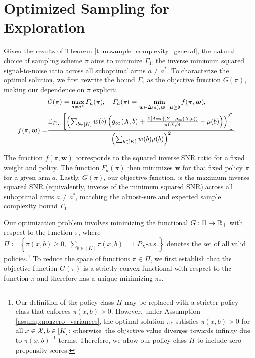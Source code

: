 \documentclass{article}
\begin{document}
\section{Optimized Sampling for Exploration}
\label{sec:sampling}

Given the results of Theorem \ref{thm:sample_complexity_general}, the natural choice of sampling scheme $\pi$ aims to minimize $\Gamma_1$, the inverse minimum squared signal-to-noise ratio across all suboptimal arms $a \neq a^*$. To characterize the optimal solution, we first rewrite the bound $\Gamma_1$ as the objective function $G(\pi)$, making our dependence on $\pi$ explicit:
\begin{align}\label{eq:G_pi}
    &G(\pi) = \max_{a \neq a^*} F_a(\pi), \quad F_a(\pi) = \min_{\boldsymbol{w} \in \Delta(a), \boldsymbol{w}^\top \boldsymbol{\mu} \geq 0} f(\pi, \boldsymbol{w}), \\
    f(\pi, \boldsymbol{w}) =& \frac{\mathbb{E}_{P_\infty}\left[\left( \sum_{b \in [K]} w(b)\left(g_\infty(X,b) + \frac{\mathbf{1}[A=b](Y - g_\infty(X,b))}{\pi(X,b)} -\mu(b)\right) \right)^2 \right]}{\left(\sum_{b \in [K]} w(b) \mu(b)\right)^2}.
\end{align}

The function $f(\pi, \bm{w})$ corresponds to the squared inverse SNR ratio for a fixed weight and policy. The function $F_a(\pi)$ then minimizes $\bm{w}$ for that fixed policy $\pi$ for a given arm $a$. Lastly, $G(\pi)$, our objective function, is the maximum inverse squared SNR (equivalently, inverse of the minimum squared SNR) across all suboptimal arms $a \neq a^*$, matching the almost-sure and expected sample complexity bound $\Gamma_1$. 

Our optimization problem involves minimizing the functional $G: \Pi \rightarrow \mathbb{R}_+$ with respect to the function $\pi$, where $\Pi \coloneqq \left\{\pi(x,b) \geq 0, \ \sum_{b \in [K]}\pi(x,b) = 1 \ P_X\text{-a.s.} \right\}$ denotes the set of all valid policies.\footnote{Our definition of the policy class $\Pi$ may be replaced with a stricter policy class that enforces $\pi(x,b)> 0$. However, under Assumption \ref{assump:nonzero_variances}, the optimal solution $\pi_*$ satisfies $\pi(x,b) > 0$ for all $x \in \mathcal{X}, b \in [K]$; otherwise, the objective value diverges towards infinity due to  $\pi(x,b)^{-1}$ terms. Therefore, we allow our policy class $\Pi$ to include zero propensity scores.} To reduce the space of functions $\pi \in \Pi$, we first establish that the objective function $G(\pi)$ is a strictly convex functional with respect to the function $\pi$ and therefore has a unique minimizing $\pi_*$.
\end{document}
